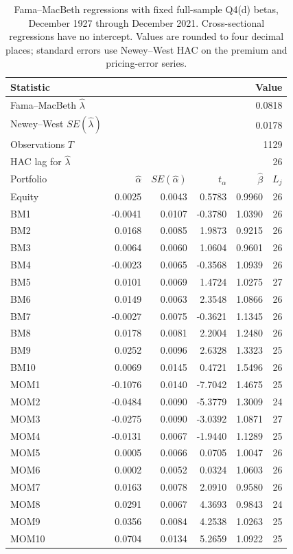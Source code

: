 \begin{table}[!htbp]
  \centering
  \small
  \caption{Fama--MacBeth regressions with fixed full-sample Q4(d) betas,
  December 1927 through December 2021.
  Cross-sectional regressions have no intercept. Values are rounded to four decimal places;
  standard errors use Newey--West HAC on the premium and pricing-error series.}
  \label{tab:q4e-fama-macbeth-results}
  \begin{tabular}{lrrrrr}
    \toprule
    Statistic & \multicolumn{5}{r}{Value} \\
    \midrule
    Fama--MacBeth $\hat\lambda$ & \multicolumn{5}{r}{0.0818} \\
    Newey--West $SE(\hat\lambda)$ & \multicolumn{5}{r}{0.0178} \\
    Observations $T$ & \multicolumn{5}{r}{1129} \\
    HAC lag for $\hat\lambda$ & \multicolumn{5}{r}{26} \\
    \midrule
    Portfolio & $\hat\alpha$ & $SE(\hat\alpha)$ & $t_\alpha$ & $\hat\beta$ & $L_j$ \\
    \midrule
    Equity & 0.0025 & 0.0043 & 0.5783 & 0.9960 & 26 \\
    \addlinespace
    BM1 & -0.0041 & 0.0107 & -0.3780 & 1.0390 & 26 \\
    BM2 & 0.0168 & 0.0085 & 1.9873 & 0.9215 & 26 \\
    BM3 & 0.0064 & 0.0060 & 1.0604 & 0.9601 & 26 \\
    BM4 & -0.0023 & 0.0065 & -0.3568 & 1.0939 & 26 \\
    BM5 & 0.0101 & 0.0069 & 1.4724 & 1.0275 & 27 \\
    BM6 & 0.0149 & 0.0063 & 2.3548 & 1.0866 & 26 \\
    BM7 & -0.0027 & 0.0075 & -0.3621 & 1.1345 & 26 \\
    BM8 & 0.0178 & 0.0081 & 2.2004 & 1.2480 & 26 \\
    BM9 & 0.0252 & 0.0096 & 2.6328 & 1.3323 & 25 \\
    BM10 & 0.0069 & 0.0145 & 0.4721 & 1.5496 & 26 \\
    \addlinespace
    MOM1 & -0.1076 & 0.0140 & -7.7042 & 1.4675 & 25 \\
    MOM2 & -0.0484 & 0.0090 & -5.3779 & 1.3009 & 24 \\
    MOM3 & -0.0275 & 0.0090 & -3.0392 & 1.0871 & 27 \\
    MOM4 & -0.0131 & 0.0067 & -1.9440 & 1.1289 & 25 \\
    MOM5 & 0.0005 & 0.0066 & 0.0705 & 1.0047 & 26 \\
    MOM6 & 0.0002 & 0.0052 & 0.0324 & 1.0603 & 26 \\
    MOM7 & 0.0163 & 0.0078 & 2.0910 & 0.9580 & 26 \\
    MOM8 & 0.0291 & 0.0067 & 4.3693 & 0.9843 & 24 \\
    MOM9 & 0.0356 & 0.0084 & 4.2538 & 1.0263 & 25 \\
    MOM10 & 0.0704 & 0.0134 & 5.2659 & 1.0922 & 25 \\
    \bottomrule
  \end{tabular}
\end{table}
